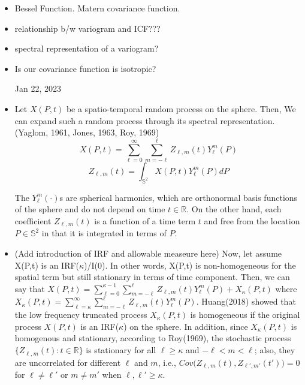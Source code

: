 \documentclass[11pt]{article}
\begin{document}
\begin{itemize}
\item Bessel Function. Matern covariance function.\\

\item relationship b/w variogram and ICF???\\

\item spectral representation of a variogram?\\

\item Is our covariance function is isotropic?\ 

\pagebreak


Jan 22, 2023\\

\item
Let $X(P,t)$ be a spatio-temporal random process on the sphere. Then, We can expand such a random process through its spectral representation.(Yaglom, 1961, Jones, 1963, Roy, 1969)\\
$$ X(P,t)= \sum_{\ell=0}^{\infty}\sum_{m=-\ell}^{\ell}Z_{\ell,m}(t)Y_\ell^m(P)$$
$$Z_{\ell,m}(t)=\int_{\mathbb{S}^2} X(P,t)Y_\ell^m(P)dP$$

The $Y_\ell^m(\cdot)$s are spherical harmonics, which are orthonormal basis functions of the sphere and do not depend on time $t \in \mathbb{R}$. On the other hand, each coefficient $Z_{\ell,m}(t)$ is a function of a time term $t$ and free from the location $P \in \mathbb{S}^2$ in that it is integrated in terms of $P$. \\

\item (Add introduction of IRF and allowable measeure here) Now, let assume X(P,t) is an IRF($\kappa$)/I(0). In other words, X(P,t) is non-homogeneous for the spatial term but still stationary in terms of time component. Then, we can say that $X(P,t) = \sum_{\ell=0}^{\kappa-1} \sum_{m=-\ell}^{\ell}Z_{\ell,m}(t)Y_\ell^m(P) + X_\kappa(P,t)$ where $X_\kappa(P,t) =  \sum_{\ell=\kappa}^{\infty} \sum_{m=-\ell}^{\ell} Z_{\ell,m}(t) Y_{\ell}^{m}(P).$ Huang(2018) showed that the low frequency truncated process $X_\kappa(P,t)$ is homogeneous if the original process $X(P,t)$ is an IRF($\kappa$) on the sphere. In addition, since $X_{\kappa}(P,t)$ is homogenous and stationary, according to Roy(1969), the stochastic process $\{Z_{\ell,m}(t) : t \in \mathbb{R} \}$ is stationary for all $\ell \ge \kappa$ and $-\ell < m < \ell$; also, they are uncorrelated for different $\ell$ and $m$, i.e., $Cov\biggl(Z_{\ell,m}(t), Z_{\ell',m'}(t')\biggl)=0$ for $\ell \ne \ell'$ or $m \ne m'$ when $\ell, \ell' \ge \kappa$.\\


\end{itemize}
\end{document}
